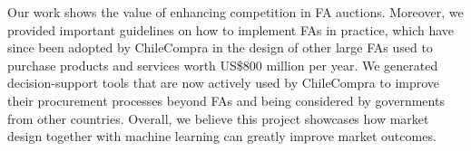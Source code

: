  Our work shows the value of enhancing competition in FA auctions. Moreover, we provided important guidelines on how to implement FAs in practice, which have since been adopted by ChileCompra in the design of other large FAs used to purchase products and services worth US\$800 million per year. We generated decision-support tools that are now actively used by ChileCompra to improve their procurement processes beyond FAs and being considered by governments from other countries. Overall, we believe this project showcases how  market design together with machine learning can greatly improve market outcomes. 


